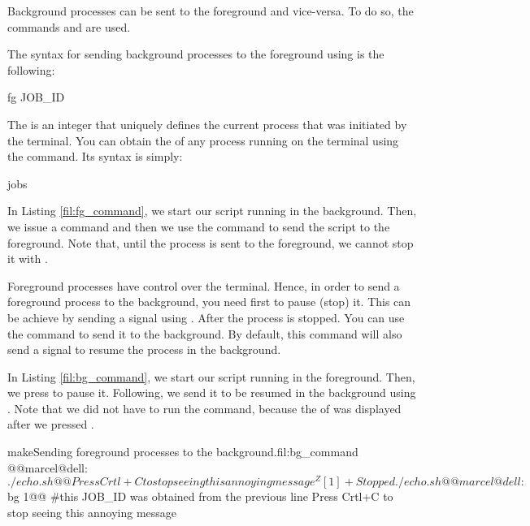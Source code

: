 Background processes can be sent to the foreground and vice-versa. To do so, the commands  and  are used.

The syntax for sending background processes to the foreground using  is the following:
\begin{command_line}[make]
fg JOB_ID
\end{command_line}
The  is an integer that uniquely defines the current process that was initiated by the terminal. You can obtain the  of any process running on the terminal using the  command. Its syntax is simply:
\begin{command_line}[make]
jobs
\end{command_line}


In Listing \ref{fil:fg_command}, we start our  script running in the background. Then, we issue a  command and then we use the  command to send the script to the foreground. Note that, until the process is sent to the foreground, we cannot stop it with . 

Foreground processes have control over the terminal. Hence, in order to send a foreground process to the background, you need first to pause (stop) it. This can be achieve by sending a  signal using . After the process is stopped. You can use the  command to send it to the background. By default, this command will also send a  signal to resume the process in the background.

In Listing \ref{fil:bg_command}, we start our  script running in the foreground. Then, we press  to pause it. Following, we send it to be resumed in the background using . Note that we did not have to run the  command, because the  of  was displayed after we pressed .
\begin{command_line_float}{make}{Sending foreground processes to the background.}{fil:bg_command}
@@marcel@dell:~$./echo.sh@@
Press Crtl+C to stop seeing this annoying message
^Z
[1]+  Stopped                 ./echo.sh
@@marcel@dell:~$bg 1@@ #this JOB_ID was obtained from the previous line
Press Crtl+C to stop seeing this annoying message
\end{command_line_float}

